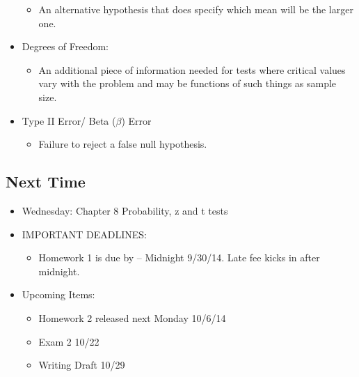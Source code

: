 \documentclass[]{article}
\begin{document}
\begin{itemize}
  \begin{itemize}
  \itemsep1pt\parskip0pt
  \item
    An alternative hypothesis that does specify which mean will be the
    larger one.
  \end{itemize}
\item
  Degrees of Freedom:

  \begin{itemize}
  \itemsep1pt\parskip0pt
  \item
    An additional piece of information needed for tests where critical
    values vary with the problem and may be functions of such things as
    sample size.
  \end{itemize}
\item
  Type II Error/ Beta ($\beta$) Error

  \begin{itemize}
  \itemsep1pt\parskip0pt
  \item
    Failure to reject a false null hypothesis.
  \end{itemize}
\end{itemize}

\subsection{Next Time}\label{next-time}

\begin{itemize}
\itemsep1pt\parskip0pt
\item
  Wednesday: Chapter 8 Probability, z and t tests
\item
  IMPORTANT DEADLINES:

  \begin{itemize}
  \itemsep1pt\parskip0pt
  \item
    Homework 1 is due by -- Midnight 9/30/14. Late fee kicks in after
    midnight.
  \end{itemize}
\item
  Upcoming Items:

  \begin{itemize}
  \itemsep1pt\parskip0pt
  \item
    Homework 2 released next Monday 10/6/14
  \item
    Exam 2 10/22
  \item
    Writing Draft 10/29
  \end{itemize}
\end{itemize}
\end{document}
